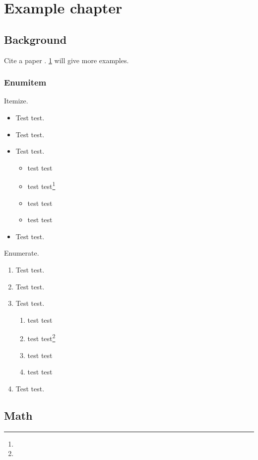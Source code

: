 \chapter{Example chapter}\label{chap:sample}

\section{Background}\label{chap:intro:sec:background}

\blindtext

Cite a paper \cite{test}. \cref{chap:sample} will give more examples.

\subsection{Enumitem}

Itemize.

\begin{itemize}
  \item Test test.
  \item Test test.
  \item Test test.
  \begin{itemize}
    \item test test
    \item test test\footnote{\blindtext}
    \item test test
    \item test test
  \end{itemize}
  \item Test test.
\end{itemize}

Enumerate.

\begin{enumerate}
  \item Test test.
  \item Test test.
  \item Test test.
  \begin{enumerate}
    \item test test
    \item test test\footnote{\blindtext}
    \item test test
    \item test test
  \end{enumerate}
  \item Test test.
\end{enumerate}

\section{Math}

